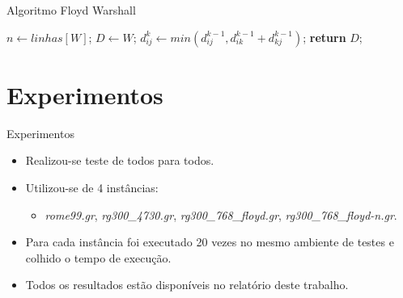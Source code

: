 \documentclass[aspectratio=169]{beamer}
\begin{document}
	\begin{frame}{Algoritmo Floyd Warshall}
		\begin{algorithm}[H]
			\caption{Floyd-Warshall}\label{alg:fw}
			\begin{algorithmic}[1]
				\State $n \gets linhas[W]$;
				\State $D\gets W$;
				          
				          
				          
				\State $d^k_{ij} \gets min(d^{k-1}_{ij}, d^{k-1}_{ik} + d^{k-1}_{kj})$;  
				\EndFor
				\EndFor
				\EndFor
				\State \textbf{return} $D$;
				\EndProcedure
			\end{algorithmic}
		\end{algorithm}
	\end{frame}

\section{Experimentos}
	\begin{frame}{Experimentos}
		\begin{itemize}
			
			\item Realizou-se teste de todos para todos.
			
			\bigskip
						
			\item Utilizou-se de 4 instâncias:
			\begin{itemize}
				\item \textit{rome99.gr}, \textit{rg300\_4730.gr}, \textit{rg300\_768\_floyd.gr}, \textit{rg300\_768\_floyd-n.gr}.
			\end{itemize}
			
			\bigskip
			
			\item Para cada instância foi executado 20 vezes no mesmo ambiente de testes e colhido o tempo de execução.
			
			\bigskip
			
			\item Todos os resultados estão disponíveis no relatório deste trabalho.
		\end{itemize}
	\end{frame}
	
\end{document}
